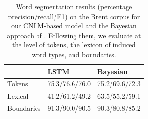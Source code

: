 \begin{table}[t]
  \begin{small}
    \begin{center}
      \begin{tabular}{l|ll}
        &	     LSTM & Bayesian \\ \hline %
        Tokens & 75.3/76.6/76.0 & 75.2/69.6/72.3 \\
        Lexical & 41.2/61.2/49.2 &63.5/55.2/59.1  \\
        Boundaries & 91.3/90.0/90.5 & 90.3/80.8/85.2 \\
      \end{tabular}
    \end{center}
  \end{small}
  \caption{\label{tab:segmentation-results-brent} Word segmentation results (percentage precision/recall/F1)  on the Brent corpus for our CNLM-based model and the Bayesian approach of . Following them, we evaluate at the level of tokens, the lexicon of induced word types, and boundaries.}
\end{table}






